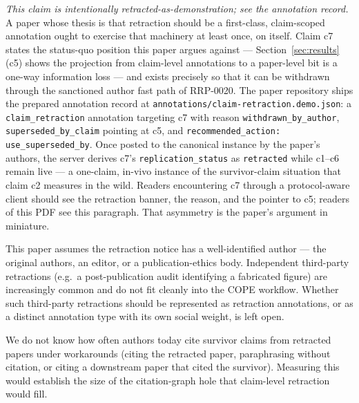 \documentclass{rrxiv}
\begin{document}
\emph{This claim is intentionally retracted-as-demonstration; see the annotation record.} A paper whose thesis is that retraction should be a first-class, claim-scoped annotation ought to exercise that machinery at least once, on itself. Claim c7 states the status-quo position this paper argues against --- Section~\ref{sec:results} (c5) shows the projection from claim-level annotations to a paper-level bit is a one-way information loss --- and exists precisely so that it can be withdrawn through the sanctioned author fast path of RRP-0020. The paper repository ships the prepared annotation record at \texttt{annotations/claim-retraction.demo.json}: a \texttt{claim\_retraction} annotation targeting c7 with reason \texttt{withdrawn\_by\_author}, \texttt{superseded\_by\_claim} pointing at c5, and \texttt{recommended\_action: use\_superseded\_by}. Once posted to the canonical instance by the paper's authors, the server derives c7's \texttt{replication\_status} as \texttt{retracted} while c1--c6 remain live --- a one-claim, in-vivo instance of the survivor-claim situation that claim c2 measures in the wild. Readers encountering c7 through a protocol-aware client should see the retraction banner, the reason, and the pointer to c5; readers of this PDF see this paragraph. That asymmetry is the paper's argument in miniature.

\begin{openquestion}
This paper assumes the retraction notice has a well-identified author --- the original authors, an editor, or a publication-ethics body. Independent third-party retractions (e.g.\ a post-publication audit identifying a fabricated figure) are increasingly common and do not fit cleanly into the COPE workflow. Whether such third-party retractions should be represented as retraction annotations, or as a distinct annotation type with its own social weight, is left open.
\end{openquestion}

\begin{openquestion}
We do not know how often authors today cite survivor claims from retracted papers under workarounds (citing the retracted paper, paraphrasing without citation, or citing a downstream paper that cited the survivor). Measuring this would establish the size of the citation-graph hole that claim-level retraction would fill.
\end{openquestion}
\end{document}
